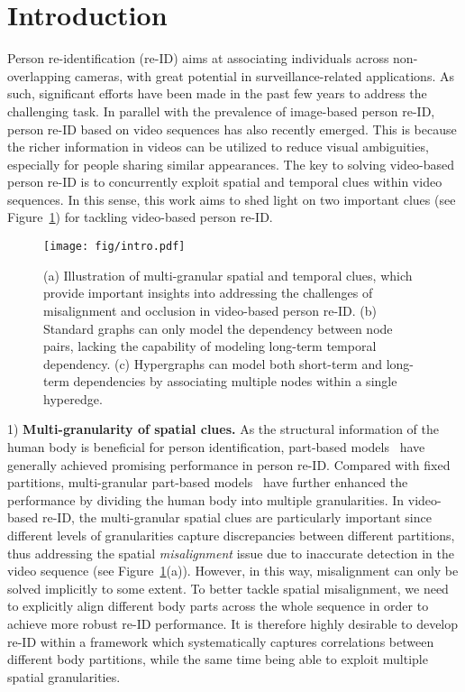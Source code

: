 \documentclass[10pt,twocolumn,letterpaper]{article}
\begin{document}
\section{Introduction}
Person re-identification (re-ID) aims at associating individuals across non-overlapping cameras, with great potential in surveillance-related applications. As such, significant efforts have been made in the past few years to address the challenging task. In parallel with the prevalence of image-based person re-ID, person re-ID based on video sequences has also recently emerged. This is because the richer information in videos can be utilized to reduce visual ambiguities, especially for people sharing similar appearances. The key to solving video-based person re-ID is to concurrently exploit spatial and temporal clues within video sequences. In this sense, this work aims to shed light on two important clues (see Figure~\ref{fig:intro}) for tackling video-based person re-ID.

\begin{figure}[t]
\setlength{\abovecaptionskip}{-0.2mm}
 \centering
 \texttt{[image: fig/intro.pdf]}
 \caption{(a) Illustration of multi-granular spatial and temporal clues, which provide important insights into addressing the challenges of misalignment and occlusion in video-based person re-ID. (b) Standard graphs can only model the dependency between node pairs, lacking the capability of modeling long-term temporal dependency. (c) Hypergraphs can model both short-term and long-term dependencies by associating multiple nodes within a single hyperedge.}
 \label{fig:intro}
 \vspace{-4mm}
\end{figure}

1) \textbf{Multi-granularity of spatial clues.} As the structural information of the human body is beneficial for person identification, part-based models~\cite{DBLP:conf/eccv/VariorSLXW16,DBLP:conf/cvpr/LiC0H17,DBLP:conf/eccv/SunZYTW18} have generally achieved promising performance in person re-ID. Compared with fixed partitions, multi-granular part-based models~\cite{DBLP:conf/mm/WangYCLZ18,DBLP:conf/cvpr/ZhengDSJGYHJ19} have further enhanced the performance by dividing the human body into multiple granularities. In video-based re-ID, the multi-granular spatial clues are particularly important since different levels of granularities capture discrepancies between different partitions, thus addressing the spatial \emph{misalignment} issue due to inaccurate detection in the video sequence (see Figure~\ref{fig:intro}(a)).  
However, in this way, misalignment can only be solved implicitly to some extent. To better tackle spatial misalignment, we need to explicitly align different body parts across the whole sequence in order to achieve more robust re-ID performance.
It is therefore highly desirable to develop re-ID within a framework which systematically captures correlations between different body partitions, while the same time being able to exploit multiple spatial granularities.
\end{document}
